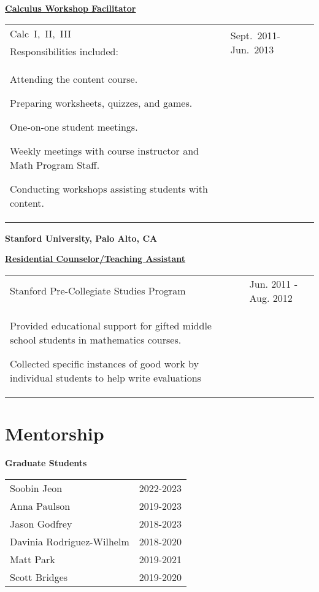 \documentclass[margin,line]{res}
\newenvironment{list1}{
  \begin{list}{\ding{113}}{%
      \setlength{\itemsep}{0in}
      \setlength{\parsep}{0in} \setlength{\parskip}{0in}
      \setlength{\topsep}{0in} \setlength{\partopsep}{0in}
      \setlength{\leftmargin}{0.17in}}}{\end{list}}
\renewcommand{\subsection}[1]{%
      \par\vspace{3pt}%
      \underline{\normalsize\bfseries #1}%
      \par\vspace{3pt}%
    }
\begin{document}
\begin{resume}
\subsection{\sc Calculus Workshop Facilitator}
\begin{tabular}{@{}p{4in}p{1.0in}}
  Calc~I,~II,~III & \multirow{2}{1in}{Sept.~2011-Jun.~2013}\\
  Responsibilities included:\\
\begin{list1}
    \item Attending the content course.
    \item Preparing worksheets, quizzes, and games.
    \item One-on-one student meetings.
    \item Weekly meetings with course instructor and Math Program Staff.
    \item Conducting workshops assisting students with content.
\end{list1}
\end{tabular}

\vspace{.5cm}
{\bf Stanford University, Palo Alto, CA}
\subsection{\sc Residential Counselor/Teaching Assistant} 

\begin{tabular}{@{}p{4in}p{1.0in}}
Stanford Pre-Collegiate Studies Program~  & Jun. 2011 - Aug. 2012\\
\begin{list1}
  \item Provided educational support for gifted middle school students in mathematics courses.
  \item Collected specific instances of good work by individual students to help write evaluations
\end{list1}
\end{tabular}

\section{\sc Mentorship} 
{\bf Graduate Students}

\begin{tabular}{@{}p{4.0in}p{1.0in}}
  Soobin Jeon & \multirow{1}{1in}{2022-2023}\\
  Anna Paulson  & \multirow{1}{1in}{2019-2023}\\
  Jason Godfrey & \multirow{1}{1in}{2018-2023}\\
  Davinia Rodriguez-Wilhelm & \multirow{1}{1in}{2018-2020}\\
  Matt Park & \multirow{1}{1in}{2019-2021}\\
  Scott Bridges & \multirow{1}{1in}{2019-2020}\\
\end{tabular}


\end{resume}
\end{document}
